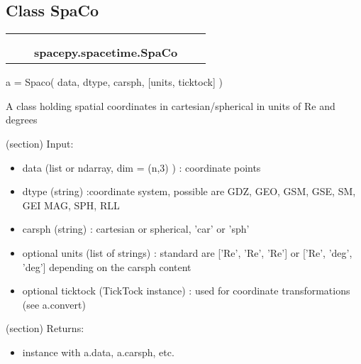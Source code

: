 
\subsection{Class SpaCo}

    \label{spacepy:spacetime:SpaCo}
\begin{tabular}{cccccc}
\multicolumn{2}{r}{\settowidth{\BCL}{object}\multirow{2}{\BCL}{object}}
&&
  \\\cline{3-3}
  &&\multicolumn{1}{c|}{}
&&
  \\
&&\multicolumn{2}{l}{\textbf{spacepy.spacetime.SpaCo}}
\end{tabular}

a = Spaco( data, dtype, carsph, [units, ticktock] )

A class holding spatial coordinates in cartesian/spherical in units of Re 
and degrees

(section) Input:

  \begin{itemize}
  \setlength{\parskip}{0.6ex}
    \item data (list or ndarray, dim = (n,3) ) : coordinate points

    \item dtype (string) :coordinate system, possible are GDZ, GEO, GSM, GSE, 
      SM, GEI MAG, SPH, RLL

    \item carsph (string) : cartesian or spherical, 'car' or 'sph'

    \item optional units (list of strings) : standard are  ['Re', 'Re', 'Re'] 
      or ['Re', 'deg', 'deg'] depending on the carsph content

    \item optional ticktock (TickTock instance) : used for coordinate 
      transformations (see a.convert)

  \end{itemize}

(section) Returns:

  \begin{itemize}
  \setlength{\parskip}{0.6ex}
    \item instance with a.data, a.carsph, etc.

  \end{itemize}

